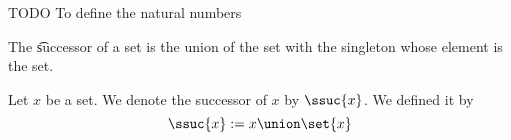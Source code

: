 
\sbasic









\sstart
{}


TODO
To define the natural numbers


The \t{successor} of a set is the union of the set with the singleton whose element is the set.


Let $x$ be a set.
We denote the successor of $x$ by $\ssuc{x}$.
We defined it by
$$
  \ssuc{x} := x \union \set{x}
$$
\strats
